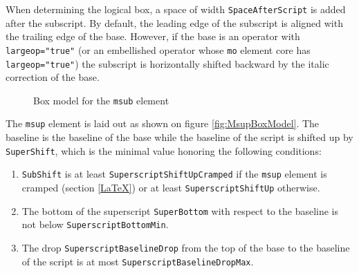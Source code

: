 When determining
the logical box, a space of width {\tt SpaceAfterScript}
is added after
the subscript. By default, the leading edge of the subscript is aligned with
the trailing edge of the base. However, if the base is an operator with
{\tt largeop="true"} (or an embellished operator whose {\tt mo} element core
has {\tt largeop="true"}) the subscript is horizontally shifted backward
by the italic correction of the base.

\begin{figure}
\centering
\caption{Box model for the {\tt msub} element}
\label{fig:MsubBoxModel}
\end{figure}

The {\tt msup} element is laid out as shown on figure \ref{fig:MsupBoxModel}.
The baseline is the baseline of the base while the baseline of the script is
shifted up by {\tt SuperShift}, which is the minimal value honoring the
following conditions:
\begin{enumerate}
\item {\tt SubShift} is at least
  {\tt SuperscriptShiftUpCramped} if the {\tt msup} element is
  cramped (section \ref{LaTeX}) or at least
  {\tt SuperscriptShiftUp} otherwise.
\item The bottom of the superscript {\tt SuperBottom} with respect to the
  baseline is not below {\tt SuperscriptBottomMin}.
\item The drop {\tt SuperscriptBaselineDrop} from the top of the base to
  the baseline of the script is at most {\tt SuperscriptBaselineDropMax}.
\end{enumerate}

